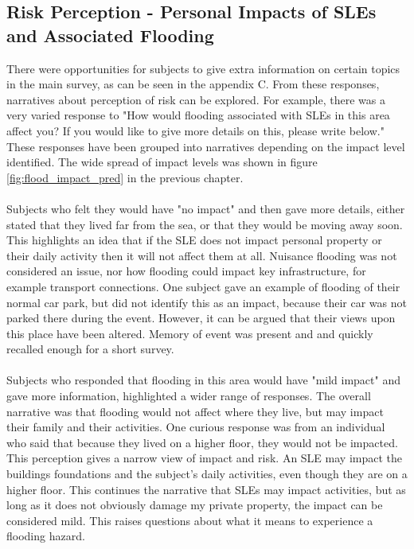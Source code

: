 \subsection{Risk Perception - Personal Impacts of SLEs and Associated Flooding}
There were opportunities for subjects to give extra information on certain topics in the main survey, as can be seen in the appendix C. From these responses, narratives about perception of risk can be explored. For example, there was a very varied response to "How would flooding associated with SLEs in this area affect you? If you would like to give more details on this, please write below." These responses have been grouped into narratives depending on the impact level identified. The wide spread of impact levels was shown in figure \ref{fig:flood_impact_pred} in the previous chapter. 
\paragraph{}

Subjects who felt they would have "no impact" and then gave more details, either stated that they lived far from the sea, or that they would be moving away soon. This highlights an idea that if the SLE does not impact personal property or their daily activity then it will not affect them at all. Nuisance flooding was not considered an issue, nor how flooding could impact key infrastructure, for example transport connections. One subject gave an example of flooding of their normal car park, but did not identify this as an impact, because their car was not parked there during the event. However, it can be argued that their views upon this place have been altered. Memory of event was present and and quickly recalled enough for a short survey.  
\paragraph{}

Subjects who responded that flooding in this area would have "mild impact" and gave more information, highlighted a wider range of responses. The overall narrative was that flooding would not affect where they live, but may impact their family and their activities. One curious response was from an individual who said that because they lived on a higher floor, they would not be impacted. This perception gives a narrow view of impact and risk. An SLE may impact the buildings foundations and the subject's daily activities, even though they are on a higher floor. This continues the narrative that SLEs may impact activities, but as long as it does not obviously damage my private property, the impact can be considered mild. This raises questions about what it means to experience a flooding hazard. 
